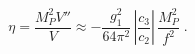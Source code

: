 \begin{equation}
\eta = \frac{M_P^2 V''}{V} \approx -\frac{g_1^2}{64\pi^2} \,
\left|\frac{c_3}{c_2}\right| \, \frac{M_P^2}{f^2} \;.
\end{equation}

